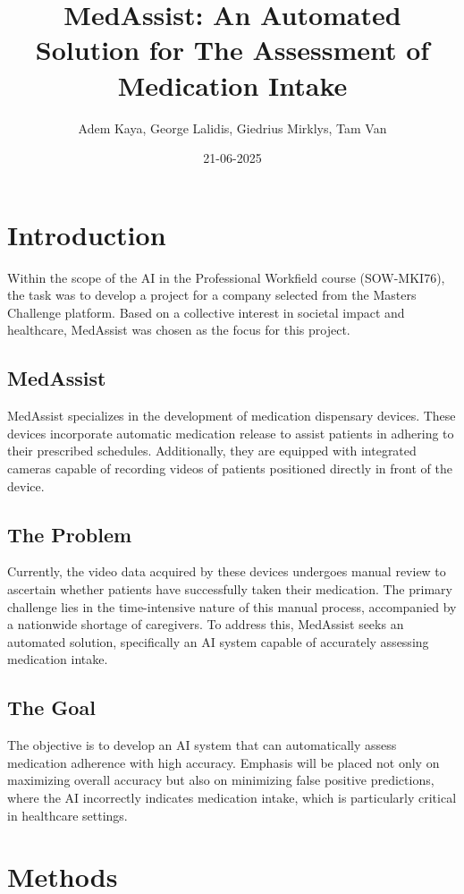 \documentclass[a4paper,12pt]{article}
\title{MedAssist: An Automated Solution for The Assessment of Medication Intake}
\author{Adem Kaya, George Lalidis, Giedrius Mirklys, Tam Van}
\date{21-06-2025}
\begin{document}
\maketitle

\section{Introduction}
Within the scope of the AI in the Professional Workfield course (SOW-MKI76), the task was to develop a project for a 
company selected from the Masters Challenge platform. Based on a collective interest in societal impact and healthcare, 
MedAssist was chosen as the focus for this project.

\subsection{MedAssist}
MedAssist specializes in the development of medication dispensary devices. These devices incorporate automatic medication
 release to assist patients in adhering to their prescribed schedules. Additionally, they are equipped with integrated
  cameras capable of recording videos of patients positioned directly in front of the device.

\subsection{The Problem}
Currently, the video data acquired by these devices undergoes manual review to ascertain whether patients have successfully
 taken their medication. The primary challenge lies in the time-intensive nature of this manual process, accompanied by a 
 nationwide shortage of caregivers. To address this, MedAssist seeks an automated solution, specifically an AI system 
 capable of accurately assessing medication intake.

\subsection{The Goal}
The objective is to develop an AI system that can automatically assess medication adherence with high accuracy. Emphasis 
will be placed not only on maximizing overall accuracy but also on minimizing false positive predictions, where the AI
incorrectly indicates medication intake, which is particularly critical in healthcare settings.

\section{Methods}
\end{document}
